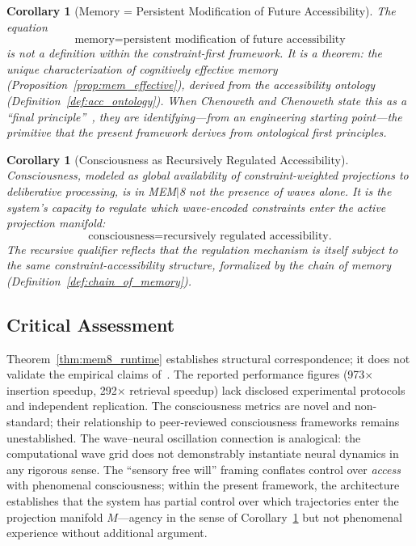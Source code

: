 \documentclass[12pt, a4paper, twoside]{article}
\theoremstyle{plain}
\newtheorem{corollary}[theorem]{Corollary}
\theoremstyle{definition}
\theoremstyle{remark}
\begin{document}
\begin{corollary}[Memory = Persistent Modification of Future Accessibility]
\label{cor:memory_theorem}
The equation
\[
  \text{memory} = \text{persistent modification of future accessibility}
\]
is not a definition within the constraint-first framework. It is a theorem: the
unique characterization of cognitively effective memory
(Proposition~\ref{prop:mem_effective}), derived from the accessibility ontology
(Definition~\ref{def:acc_ontology}). When Chenoweth and Chenoweth state this
as a ``final principle''~\cite{mem8_2025}, they are identifying---from an
engineering starting point---the primitive that the present framework derives
from ontological first principles.
\end{corollary}

\begin{corollary}[Consciousness as Recursively Regulated Accessibility]
\label{cor:consciousness_acc}
Consciousness, modeled as global availability of constraint-weighted projections
to deliberative processing, is in MEM$|$8 not the presence of waves alone.
It is the system's capacity to regulate which wave-encoded constraints enter
the active projection manifold:
\[
  \text{consciousness} = \text{recursively regulated accessibility.}
\]
The recursive qualifier reflects that the regulation mechanism is itself subject
to the same constraint-accessibility structure, formalized by the chain of
memory (Definition~\ref{def:chain_of_memory}).
\end{corollary}

\subsection{Critical Assessment}

Theorem~\ref{thm:mem8_runtime} establishes structural correspondence; it does
not validate the empirical claims of~\cite{mem8_2025}. The reported
performance figures (973$\times$ insertion speedup, 292$\times$ retrieval
speedup) lack disclosed experimental protocols and independent replication.
The consciousness metrics are novel and non-standard; their relationship to
peer-reviewed consciousness frameworks remains unestablished. The wave--neural
oscillation connection is analogical: the computational wave grid does not
demonstrably instantiate neural dynamics in any rigorous sense. The ``sensory
free will'' framing conflates control over \emph{access} with phenomenal
consciousness; within the present framework, the architecture establishes that
the system has partial control over which trajectories enter the projection
manifold $M$---agency in the sense of Corollary~\ref{cor:consciousness_acc}
but not phenomenal experience without additional argument.
\end{document}
